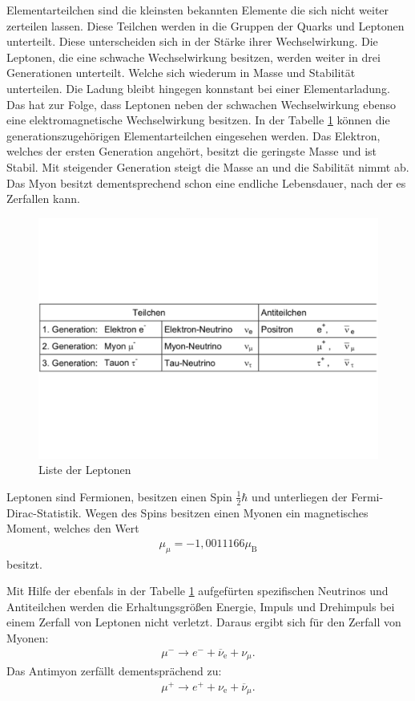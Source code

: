 Elementarteilchen sind die kleinsten bekannten Elemente die sich nicht weiter zerteilen lassen.
Diese Teilchen werden in die Gruppen der Quarks und Leptonen unterteilt.
Diese unterscheiden sich in der Stärke ihrer Wechselwirkung.
Die Leptonen, die eine schwache Wechselwirkung besitzen, werden weiter in drei Generationen unterteilt.
Welche sich wiederum in Masse und Stabilität unterteilen.
Die Ladung bleibt hingegen konnstant bei einer Elementarladung.
Das hat zur Folge, dass Leptonen neben der schwachen Wechselwirkung ebenso eine elektromagnetische Wechselwirkung besitzen.
In der Tabelle \ref{fig.gen} können die generationszugehörigen Elementarteilchen eingesehen werden.
Das Elektron, welches der ersten Generation angehört, besitzt die geringste Masse und ist Stabil.
Mit steigender Generation steigt die Masse an und die Sabilität nimmt ab.
Das Myon besitzt dementsprechend schon eine endliche Lebensdauer, nach der es Zerfallen kann.

\begin{figure}[h!]
  \centering
  \includegraphics[width=\textwidth]{tableptonen.pdf}
  \caption{Liste der Leptonen}
  \label{fig.gen}
\end{figure}
\FloatBarrier

Leptonen sind Fermionen, besitzen einen Spin $\frac{1}{2}\hbar$ und unterliegen der Fermi-Dirac-Statistik.
Wegen des Spins besitzen einen Myonen ein magnetisches Moment, welches den Wert
\begin{align*}
  \mu_{\mu} = -1,0011166\mu_{\text{B}}
\end{align*}
besitzt.

Mit Hilfe der ebenfals in der Tabelle \ref{fig.gen} aufgefürten spezifischen Neutrinos und Antiteilchen
werden die Erhaltungsgrößen Energie, Impuls und Drehimpuls bei einem Zerfall von Leptonen nicht verletzt.
Daraus ergibt sich für den Zerfall von Myonen:
\begin{align}
  \mu^{-}\rightarrow e^-+\overline{\nu}_\text{e}+\nu_{\mu}.
  \label{eqn.mu-}
\end{align}
Das Antimyon zerfällt dementsprächend zu:
\begin{align}
  \mu^{+}\rightarrow e^++\nu_\text{e}+\overline{\nu}_{\mu}.
  \label{eqn.mu+}
\end{align}

